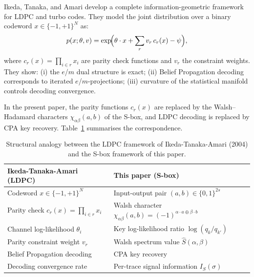 \documentclass[referee,lineno,pdflatex,sn-mathphys-num]{sn-jnl}
\theoremstyle{thmstylethree}
\theoremstyle{thmstyletwo}
\theoremstyle{thmstyleone}
\newcommand{\WHT}{\widehat}
\begin{document}
Ikeda, Tanaka, and Amari \cite{ikeda2004information} develop a complete
information-geometric framework for LDPC and turbo codes.
They model the joint distribution over a binary codeword $x\in\{-1,+1\}^N$ as:
\begin{equation}\label{eq:ikeda}
  p(x;\theta,v) = \exp\!\Bigl(\theta\cdot x + \sum_r v_r\,c_r(x) - \psi\Bigr),
\end{equation}
where $c_r(x) = \prod_{i\in r} x_i$ are parity check functions and $v_r$ the
constraint weights.
They show: (i) the $e$/$m$ dual structure is exact; (ii) Belief Propagation
decoding corresponds to iterated $e$/$m$-projections; (iii) curvature of the
statistical manifold controls decoding convergence.

In the present paper, the parity functions $c_r(x)$ are replaced by the
Walsh--Hadamard characters $\chi_{\alpha\beta}(a,b)$ of the S-box, and LDPC
decoding is replaced by CPA key recovery.
Table~\ref{tab:analogy} summarises the correspondence.

\begin{table}[htbp]
\centering
\caption{Structural analogy between the LDPC framework of Ikeda-Tanaka-Amari
(2004) and the S-box framework of this paper.}\label{tab:analogy}
\begin{tabular}{@{}ll@{}}
\toprule
Ikeda-Tanaka-Amari (LDPC) & This paper (S-box) \\
\midrule
Codeword $x\in\{-1,+1\}^N$ & Input-output pair $(a,b)\in\{0,1\}^{2s}$ \\
Parity check $c_r(x)=\prod_{i\in r} x_i$ & Walsh character $\chi_{\alpha\beta}(a,b)=(-1)^{\alpha\cdot a\oplus\beta\cdot b}$ \\
Channel log-likelihood $\theta_i$ & Key log-likelihood ratio $\log(q_k/q_{k'})$ \\
Parity constraint weight $v_r$ & Walsh spectrum value $\WHT{S}(\alpha,\beta)$ \\
Belief Propagation decoding & CPA key recovery \\
Decoding convergence rate & Per-trace signal information $I_S(\sigma)$ \\
\bottomrule
\end{tabular}
\end{table}

\end{document}
